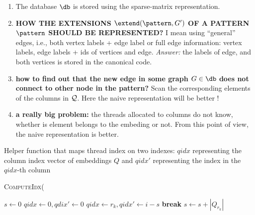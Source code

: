 \begin{enumerate}
\item The database $\db$ is stored using the sparse-matrix
  representation.
\item \textbf{HOW THE EXTENSIONS $\extend(\pattern,G')$ OF A PATTERN
  $\pattern$ SHOULD BE REPRESENTED?}  I mean using ``general'' edges,
  i.e., both vertex labels + edge label or full edge information:
  vertex labels, edge labels + ids of vertices and edge. \emph{Answer:
  } the labels of edge, and both vertices is stored in the canonical
  code.
\item \textbf{how to find out that the new edge in some graph $G\in
  \db$ does not connect to other node in the pattern?} Scan the
  corresponding elements of the columns in ${\cal Q}$. Here the naive
  representation will be better !
\item \textbf{a really big problem: } the threads allocated to columns
  do not know, whether is element belongs to the embeding or not. From
  this point of view, the naive representation is better.
\end{enumerate}
\bigskip

\begin{algorithm}[!htb]
\caption{Helper function that maps thread index on two indexes: $qidx$
  representing the column index vector of embeddings $Q$ and $qidx'$
  representing the index in the $qidx$-th column}

\vbox{\textsc{ComputeIdx}(}
\begin{algorithmic}[1]
     \STATE $s\leftarrow 0$
     \STATE $qidx\leftarrow 0, qdix'\leftarrow 0$
        \STATE $qidx\leftarrow r_k, qidx'\leftarrow i-s$
        \STATE \textbf{break}
        \ELSE
        \STATE  $s\leftarrow s + |Q_{r_k}|$
        \ENDIF
     \ENDFOR
\end{algorithmic}
\end{algorithm}

